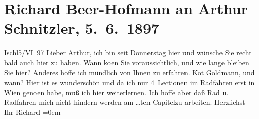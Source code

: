 

         
         \renewcommand{\erwaehntePersonen}{Personen: Richard Beer-Hofmann, Paul Goldmann}
         \renewcommand{\erwaehnteOrte}{Orte: Bad Ischl, Wien}
         \renewcommand{\erwaehnteWerke}{Werke: Der Tod Georgs}
               \section[Richard Beer-Hofmann an Arthur Schnitzler, 5. 6. 1897]{ Richard Beer-Hofmann an Arthur Schnitzler, 5. 6. 1897}\nopagebreak{}\rehead{ }\begin{ledgroupsized}[t]{13cm}\normalsize\beginnumbering{} \toendnotes[C]{\smallbreak\pagebreak[2]} 
\toendnotes[C]{\smallbreak}\pstart
           \centering{}{\pb}Ischl5/VI 97\pend
           \pstart
           Lieber Arthur, ich bin seit Donnerstag hier und wünsche
               Sie recht bald auch hier zu haben. Wann ko{\geminationm}en Sie
               voraussichtlich, und wie lange {\pb}bleiben Sie hier? Anderes hoffe ich mündlich von Ihnen zu erfahren.\pend
           \pstart
           Ko{\geminationm}t Goldmann,
               und wann?\pend
           \pstart
           Hier ist es wunderschön und da ich nur 4 Lectionen {\pb}im Radfahren erst in Wien geno{\geminationm}en habe, muß
               ich hier weiterlernen. Ich hoffe aber daß Rad u. Radfahren mich nicht hindern werden
               am {\dots}ten Capitelzu arbeiten.\pend
           \pstart
           Herzlichst{\\[\baselineskip]}Ihr \spacefill\mbox{Richard}\pend
           \leftskip=0em{}
         
         \endnumbering{}\end{ledgroupsized}  \newcommand{\dateiname}{L00683}\newcommand{\titel}{Richard Beer-Hofmann an Arthur Schnitzler, 5. 6. 1897}\newcommand{\editorInnen}{Martin Anton Müller und Gerd-Hermann Susen}
      